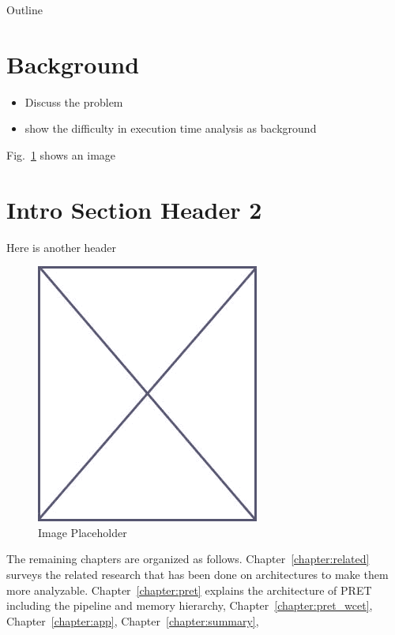 Outline

\section{Background}
\label{sec:background}
\begin{itemize}
  \item Discuss the problem
  \item show the difficulty in execution time analysis as background
\end{itemize}


Fig.~\ref{fig:placeholder_intro} shows an image

\section{Intro Section Header 2}
\label{sec:intro_sec_2}

Here is another header




\begin{figure}
\begin{center}
\vspace{-32pt}
\includegraphics[scale=.45]{figs/placeholder}
\end{center}
\vspace{-12pt}
\caption{Image Placeholder}
\label{fig:placeholder_intro}
\end{figure}

The remaining chapters are organized as follows. 
Chapter~\ref{chapter:related} surveys the related research that has been done on architectures to make them more analyzable.
Chapter~\ref{chapter:pret} explains the architecture of PRET including the \thdint pipeline and memory hierarchy, Chapter~\ref{chapter:pret_wcet}, Chapter~\ref{chapter:app}, Chapter~\ref{chapter:summary},


